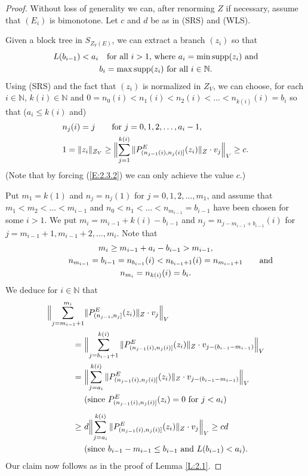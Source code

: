 \documentclass[11pt,leqno]{amsart}
\theoremstyle{definition}
\newcommand{\N}{\mathbb{N}}
\newcommand{\supp}{{\rm supp}}
\begin{document}
\begin{proof} Without loss of generality we can, after renorming $Z$
 if necessary, assume that $(E_i)$ is bimonotone. Let $c$  and $d$ be
 as in  (SRS) and (WLS).

Given a block tree in $S_{Z_V(E)}$, we can extract a branch $(z_i)$ so that
\begin{multline}\label{E:2.3.1}
  L(b_{i-1})<a_i\quad\text{for all $i>1$, where}\ a_i=\min\supp(z_i)\
  \text{and}\\
  b_i=\max\supp(z_i)\ \text{for all $i\in\N$}.
\end{multline}
Using (SRS) and the fact that $(z_i)$ is normalized in $Z_V$,
we  can choose, for each $i\in\N$,
 $k(i)\in \N$ and $0=n_0{(i)}<n_1{(i)}<n_2{(i)}<\ldots<
n_{k(i)}{(i)}=b_i$ so that ($a_i\leq k(i)$ and)
\begin{align}\label{E:2.3.2}
  &n_j(i)=j\qquad\text{for } j=0,1,2,\ldots, a_i-1,\\
  &\label{E:2.3.3}  1=\|z_i\|_{Z_V}\ge
  \Bigl\|\sum_{j=1}^{k(i)}\| P^E_{(n_{j-1}{(i)},n_j{(i)}]}(z_i)\|_Z\cdot
  v_{j}\Bigr\|_V \ge c.
\end{align}
(Note that by  forcing (\ref{E:2.3.2}) we can only achieve the value
$c$.)

Put $m_1=k(1)$ and $n_j=n_j(1)$ for $j=0,1,2,\ldots, m_1$, and assume
that $m_1<m_2<\ldots<m_{i-1}$ and $n_0<n_1<\ldots<n_{m_{i-1}}=b_{i-1}$
have been chosen for some $i>1$. We put $m_i=m_{i-1}+k(i)-b_{i-1}$ and
$n_j=n_{j-m_{i-1}+b_{i-1}}(i)$ for $j=m_{i-1}+1, m_{i-1}+2,\ldots, m_i$.
Note that
\begin{gather*}
  m_i\geq m_{i-1}+a_i-b_{i-1}>m_{i-1},\\
  \text{\phantom{and}\qquad}
  n_{m_{i-1}}=b_{i-1}=n_{b_{i-1}}(i)<n_{b_{i-1}+1}(i)=n_{m_{i-1}+1}\qquad
  \text{and}\\
  n_{m_i}=n_{k(i)}(i)=b_i.
\end{gather*}
We deduce for $i\in\N$ that
\begin{align*}
  \Bigl\|\sum_{j=m_{i-1}+1}^{m_i}&\|P^E_{(n_{j-1},n_j]}(z_i)\|_Z\cdot
  v_j\Bigr \|_V\\
  =\ & \Bigl\|\sum_{j=b_{i-1}+1}^{k(i)} \|P^E_{(n_{j-1}(i),n_j(i)]}
    (z_i)\|_Z\cdot v_{j-(b_{i-1}-m_{i-1})}\Bigr \|_V\\
  =\ & \Bigl\|\sum_{j=a_i}^{k(i)} \|P^E_{(n_{j-1}(i),n_j(i)]}
    (z_i)\|_Z\cdot v_{j-(b_{i-1}-m_{i-1})}\Bigr \|_V\\
    & \text{(since $P^E_{(n_{j-1}(i),n_j(i)]}(z_i)=0$ for
    $j<a_i$)}\\[1ex]
  \geq\ & d\Bigl\|\sum_{j=a_i}^{k(i)} \|P^E_{(n_{j-1}(i),n_j(i)]}
    (z_i)\|_Z\cdot v_j\Bigr \|_V \geq cd\\
    & \text{(since $b_{i-1}-m_{i-1}\leq b_{i-1}$ and $L(b_{i-1})<a_i$).}
\end{align*}
Our claim now follows as in  the proof of Lemma \ref{L:2.1}.\end{proof}
\end{document}
